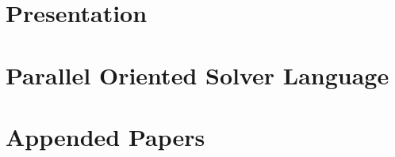 \documentclass[a4paper,11pt,twoside,parskip=half,numbers=noenddot,bibliography=totocnumbered,listof = totoc]{scrbook}
\begin{document}

\frontmatter


\cleardoublepage
%

\cleardoublepage
\dominitoc
\tableofcontents
\cleardoublepage

\cleardoublepage

\cleardoublepage
%

\mainmatter

\part{Presentation}



\part{Parallel Oriented Solver Language}

%
%

\footnotesize
{} %

\normalsize

%

\part{Appended Papers}
%
\end{document}
